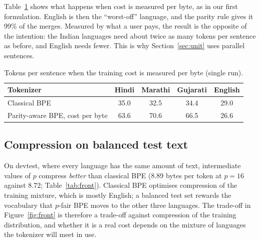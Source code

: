\documentclass[11pt,a4paper]{article}
\theoremstyle{remark}
\begin{document}
Table~\ref{tab:byte} shows what happens when cost is measured per byte, as in our first
formulation. English is then the ``worst-off'' language, and the parity rule gives it 99\%
of the merges. Measured by what a user pays, the result is the opposite of the intention:
the Indian languages need about twice as many tokens per sentence as before, and English
needs fewer. This is why Section~\ref{sec:unit} uses parallel sentences.

\begin{table}[t]
\centering
\caption{Tokens per sentence when the training cost is measured per byte (single run).}
\label{tab:byte}
\begin{tabular}{lcccc}
\toprule
Tokenizer & Hindi & Marathi & Gujarati & English\\
\midrule
Classical BPE & 35.0 & 32.5 & 34.4 & 29.0\\
Parity-aware BPE, cost per byte & 63.6 & 70.6 & 66.5 & 26.6\\
\bottomrule
\end{tabular}
\end{table}

\subsection{Compression on balanced test text}

On devtest, where every language has the same amount of text, intermediate values of $p$
compress \emph{better} than classical BPE (8.89 bytes per token at $p=16$ against 8.72;
Table~\ref{tab:front}). Classical BPE optimises compression of the training mixture, which
is mostly English; a balanced test set rewards the vocabulary that $p$-fair BPE moves to
the other three languages. The trade-off in Figure~\ref{fig:front} is therefore a trade-off
against compression of the training distribution, and whether it is a real cost depends on
the mixture of languages the tokenizer will meet in use.



\end{document}
